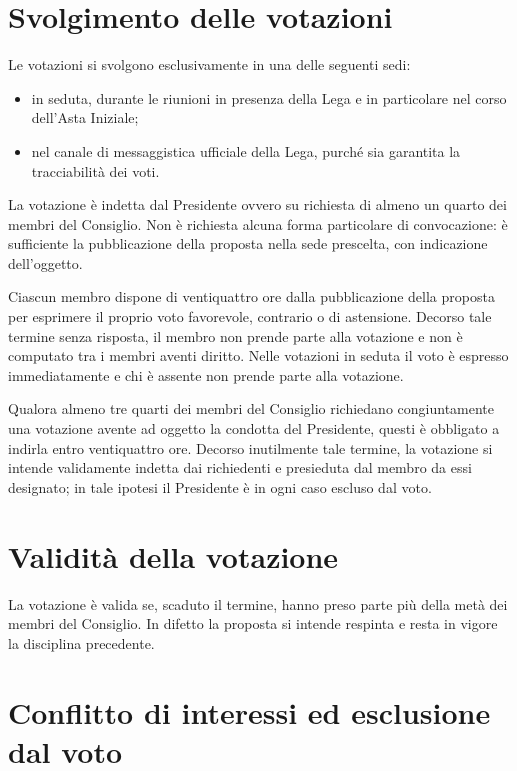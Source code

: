 \section{Svolgimento delle votazioni}
\label{art:2.3}

Le votazioni si svolgono esclusivamente in una delle seguenti sedi:

\begin{itemize}
\item in seduta, durante le riunioni in presenza della Lega e in particolare nel corso dell'Asta Iniziale;
\item nel canale di messaggistica ufficiale della Lega, purché sia garantita la tracciabilità dei voti.
\end{itemize}

La votazione è indetta dal Presidente ovvero su richiesta di almeno un quarto dei membri del Consiglio. Non è richiesta alcuna forma particolare di convocazione: è sufficiente la pubblicazione della proposta nella sede prescelta, con indicazione dell'oggetto.

Ciascun membro dispone di ventiquattro ore dalla pubblicazione della proposta per esprimere il proprio voto favorevole, contrario o di astensione. Decorso tale termine senza risposta, il membro non prende parte alla votazione e non è computato tra i membri aventi diritto. Nelle votazioni in seduta il voto è espresso immediatamente e chi è assente non prende parte alla votazione.

Qualora almeno tre quarti dei membri del Consiglio richiedano congiuntamente una votazione avente ad oggetto la condotta del Presidente, questi è obbligato a indirla entro ventiquattro ore. Decorso inutilmente tale termine, la votazione si intende validamente indetta dai richiedenti e presieduta dal membro da essi designato; in tale ipotesi il Presidente è in ogni caso escluso dal voto.

\section{Validità della votazione}
\label{art:2.4}

La votazione è valida se, scaduto il termine, hanno preso parte più della metà dei membri del Consiglio. In difetto la proposta si intende respinta e resta in vigore la disciplina precedente.

\section{Conflitto di interessi ed esclusione dal voto}
\label{art:2.5}

